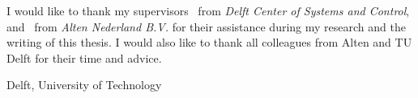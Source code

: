 \documentclass[a4paper,11pt]{mscThesis}
\begin{document}
%
\frontmatter %
%
\maketitle
%

%
    I would like to thank my supervisors \mscreaderone\ from \textit{Delft Center of Systems and Control}, and \mscreaderfour\ from \textit{Alten Nederland B.V.} for their assistance during my research and the writing of this thesis. I would also like to thank all colleagues from Alten and TU Delft for their time and advice.
    \vspace*{15mm}

    \noindent
    Delft, University of Technology \hfill \mscname\\
    \mscdate

%
    \tocloflot
%
    
    \cleardoublepage%
%
%
\mainmatter
%
%
%





%

%

%

%


	
\appendix



\backmatter
	
	
	
	
	
	\printindex

	\printnomenclature[2 cm]




\end{document}
